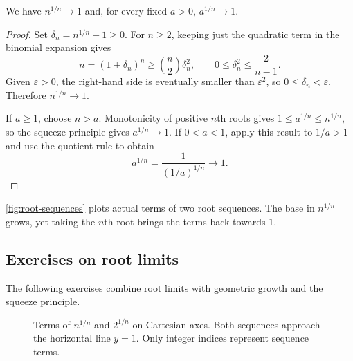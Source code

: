\begin{proposition}
  \label{thm:analysis-i:root-sequence-limits}
  We have $n^{1/n}\to1$ and, for every fixed $a>0$, $a^{1/n}\to1$.
\end{proposition}

\begin{proof}
  Set $\delta_n=n^{1/n}-1\ge0$. For $n\ge2$, keeping just the
  quadratic term in the binomial expansion gives
  \[
    n=(1+\delta_n)^n\ge\binom n2\delta_n^2,
    \qquad 0\le\delta_n^2\le\frac{2}{n-1}.
  \]
  Given $\varepsilon>0$, the right-hand side is eventually smaller
  than $\varepsilon^2$, so $0\le\delta_n<\varepsilon$.
  Therefore $n^{1/n}\to1$.

  If $a\ge1$, choose $n>a$. Monotonicity of positive $n$th roots gives
  $1\le a^{1/n}\le n^{1/n}$, so the squeeze principle gives
  $a^{1/n}\to1$. If $0<a<1$, apply this result to $1/a>1$ and use
  the quotient rule to obtain
  \[
    a^{1/n}=\frac{1}{(1/a)^{1/n}}\longrightarrow1.
  \]
\end{proof}

\autoref{fig:root-sequences} plots actual terms of two root sequences.
The base in $n^{1/n}$ grows, yet taking the $n$th root brings the terms
back towards $1$.

\subsection{Exercises on root limits}

The following exercises combine root limits with geometric growth and
the squeeze principle.




\begin{figure}[htbp]
  \centering
  
  \caption[Two root sequences approaching one.]{Terms of $n^{1/n}$ and $2^{1/n}$ on Cartesian axes.
    Both sequences approach the horizontal line $y=1$. Only integer
    indices represent sequence terms.}
  \label{fig:root-sequences}
\end{figure}
